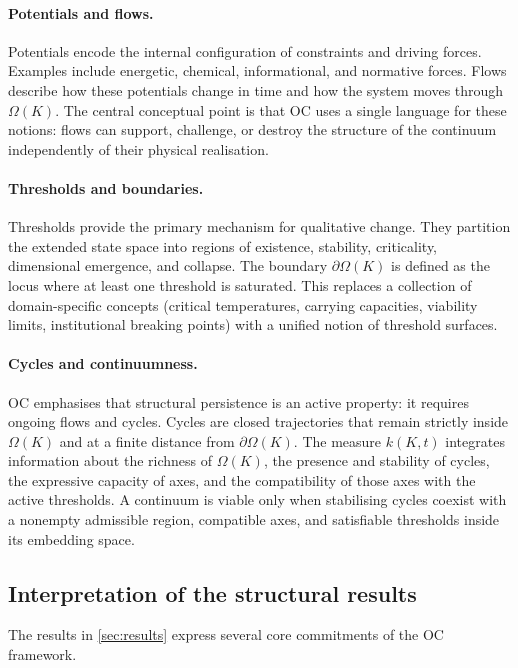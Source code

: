 \paragraph{Potentials and flows.}
Potentials encode the internal configuration of constraints and driving
forces. Examples include energetic, chemical, informational, and normative
forces.
Flows describe how these potentials change in time and how the system moves through \(\Omega(K)\).
The central conceptual point is that OC uses a single language for these notions:
flows can support, challenge, or destroy the structure of the continuum independently of their physical realisation.

\paragraph{Thresholds and boundaries.}
Thresholds provide the primary mechanism for qualitative change.
They partition the extended state space into regions of existence, stability, criticality, dimensional emergence, and collapse.
The boundary \(\partial\Omega(K)\) is defined as the locus where at least one threshold is saturated.
This replaces a collection of domain-specific concepts (critical temperatures, carrying capacities, viability limits, institutional breaking points) with a unified notion of threshold surfaces.

\paragraph{Cycles and continuumness.}
OC emphasises that structural persistence is an active property: it requires ongoing flows and cycles.
Cycles are closed trajectories that remain strictly inside \(\Omega(K)\) and at a finite distance from \(\partial\Omega(K)\).
The measure \(k(K,t)\) integrates information about the richness of \(\Omega(K)\), the presence and stability of cycles, the expressive capacity of axes, and the compatibility of those axes with the active thresholds.
A continuum is viable only when stabilising cycles coexist with a nonempty
admissible region, compatible axes, and satisfiable thresholds inside its
embedding space.

\subsection{Interpretation of the structural results}

The results in \cref{sec:results} express several core commitments of the OC framework.

